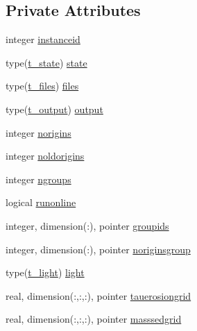 \subsection*{Private Attributes}
\begin{DoxyCompactItemize}
\item 
integer \mbox{\hyperlink{structmodulelagrangian_1_1t__lagrangian_a45d7506a2c60c0d4ca3bac4cb6dedfda}{instanceid}}
\item 
type(\mbox{\hyperlink{structmodulelagrangian_1_1t__state}{t\+\_\+state}}) \mbox{\hyperlink{structmodulelagrangian_1_1t__lagrangian_ae8c928ada013239d53fc168fffea275b}{state}}
\item 
type(\mbox{\hyperlink{structmodulelagrangian_1_1t__files}{t\+\_\+files}}) \mbox{\hyperlink{structmodulelagrangian_1_1t__lagrangian_aca54da5c3e92de56f646b776d95cb475}{files}}
\item 
type(\mbox{\hyperlink{structmodulelagrangian_1_1t__output}{t\+\_\+output}}) \mbox{\hyperlink{structmodulelagrangian_1_1t__lagrangian_a5b363b96aa7717659519bed9ec1f3451}{output}}
\item 
integer \mbox{\hyperlink{structmodulelagrangian_1_1t__lagrangian_a0c2ab19d96951fc6964e615c95abc937}{norigins}}
\item 
integer \mbox{\hyperlink{structmodulelagrangian_1_1t__lagrangian_a3f93c575c7185bd70b9fec5b7b864372}{noldorigins}}
\item 
integer \mbox{\hyperlink{structmodulelagrangian_1_1t__lagrangian_a7b9d9f43c7545d098507f191e18248bb}{ngroups}}
\item 
logical \mbox{\hyperlink{structmodulelagrangian_1_1t__lagrangian_af9c8752f86ac214c75d549863ef45024}{runonline}}
\item 
integer, dimension(\+:), pointer \mbox{\hyperlink{structmodulelagrangian_1_1t__lagrangian_a552bcafc51e74aaba6b7a3ad45e20abe}{groupids}}
\item 
integer, dimension(\+:), pointer \mbox{\hyperlink{structmodulelagrangian_1_1t__lagrangian_aa2f9d620971528aa34593d7b150f4859}{noriginsgroup}}
\item 
type(\mbox{\hyperlink{structmodulelagrangian_1_1t__light}{t\+\_\+light}}) \mbox{\hyperlink{structmodulelagrangian_1_1t__lagrangian_a87bb7c48eb5f11bebb1dbca860899a13}{light}}
\item 
real, dimension(\+:,\+:,\+:), pointer \mbox{\hyperlink{structmodulelagrangian_1_1t__lagrangian_a9ec86edf4cbd0b4d12ddfb31439590d4}{tauerosiongrid}}
\item 
real, dimension(\+:,\+:,\+:), pointer \mbox{\hyperlink{structmodulelagrangian_1_1t__lagrangian_ae5911b18641281cddcf59070ee77502e}{masssedgrid}}

\end{DoxyCompactItemize}
